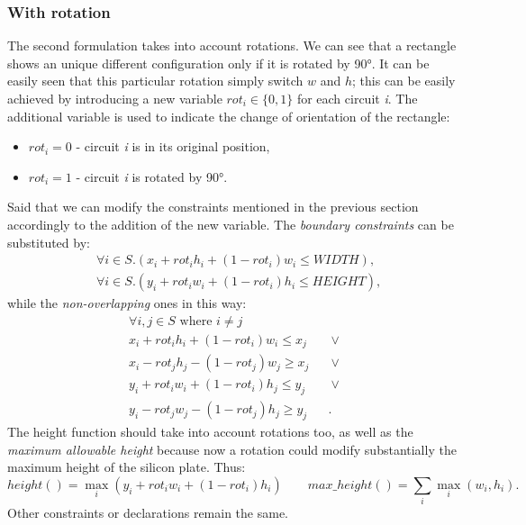 \subsubsection{With rotation}\label{subsubsec:base-rot}
The second formulation takes into account rotations. We can see that a rectangle shows an unique different configuration only if it is rotated by 90°. It can be easily seen that this particular rotation simply switch $w$ and $h$; this can be easily achieved by introducing a new variable $rot_i \in \{0, 1\}$ for each circuit \textit{i}. The additional variable is used to indicate the change of orientation of the rectangle: 
\begin{itemize}
    \item $rot_i = 0$ - circuit \textit{i} is in its original position,
    \item $rot_i = 1$ - circuit \textit{i} is rotated by 90°.
\end{itemize}
Said that we can modify the constraints mentioned in the previous section accordingly to the addition of the new variable. The \textit{boundary constraints} can be substituted by:
\begin{align}
    &\forall{i \in  S}.( x_i + rot_i h_i + (1-rot_i)w_i \leq \textit{WIDTH}),\\
    &\forall{i \in  S}.( y_i + rot_i w_i + (1-rot_i)h_i \leq \textit{HEIGHT}),
\end{align}
while the \textit{non-overlapping} ones in this way:
\begin{align}
    \forall i, j \in  S\text{ where } i \neq j \qquad\qquad \qquad&\\
    x_i + rot_i  h_i + (1 - rot_i)  w_i \leq x_j& \: \lor \\
    x_i - rot_j  h_j - (1 - rot_j)  w_j \geq x_j& \: \lor \\
    y_i + rot_i  w_i + (1 - rot_i)  h_j \leq y_j& \: \lor \\
    y_i - rot_j  w_j - (1 - rot_j)  h_j \geq y_j&.
\end{align}
The height function should take into account rotations too, as well as the \textit{maximum allowable height} because now a rotation could modify substantially the maximum height of the silicon plate. Thus: 
$$height() = \max_i {(y_i + rot_i w_i + (1 -rot_i)h_i)} \qquad max\_{height}() = \sum_i {\max_i{(w_i, h_i)}}.$$ 
Other constraints or declarations remain the same.
\clearpage